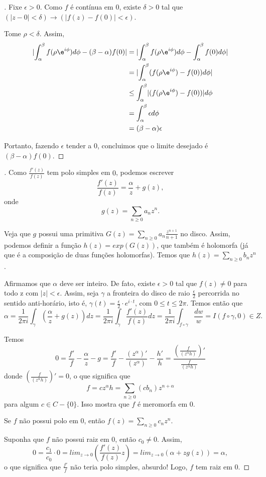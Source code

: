 \begin{proof}[]
Fixe $\epsilon>0$.
Como $f$ é contínua em $0$, existe $\delta>0$ tal que $(\lvert z-0 \rvert < \delta)\rightarrow(\lvert f(z)-f(0)\rvert<\epsilon)$.

Tome $\rho<\delta$.
Assim,
\begin{align*}
\lvert \int_{\alpha}^{\beta}f(\rho\e^{i\phi})d\phi -(\beta-\alpha)f(0)\rvert &= \lvert \int_{\alpha}^{\beta}f(\rho\e^{i\phi})d\phi -\int_{\alpha}^{\beta}f(0)d\phi \rvert  \\
&=\lvert \int_{\alpha}^{\beta}(f(\rho\e^{i\phi})-f(0))d\phi\rvert \\
&\leq \int_{\alpha}^{\beta}\lvert (f(\rho\e^{i\phi})-f(0))\rvert d\phi \\
&=\int_{\alpha}^{\beta}\epsilon d\phi \\
&=(\beta -\alpha)\epsilon \\
\end{align*}

Portanto, fazendo $\epsilon$ tender a $0$, concluimos que o limite desejado é $(\beta - \alpha)f(0)$.




\end{proof}


\begin{proof}[]

Como $\frac{f'(z)}{f(z)}$ tem polo simples em $0$, podemos escrever $$\frac{f'(z)}{f(z)}=\frac{\alpha}{z}+g(z),$$ onde $$g(z)=\sum_{n\geq 0}a_nz^n.$$

Veja que $g$ possui uma primitiva $G(z)=\sum_{n\geq 0}a_n\frac{z^{n+1}}{n+1}$ no disco. Assim, podemos definir a função $h(z)=exp(G(z))$, que também é holomorfa (já que é a composição de duas funções holomorfas). Temos que $h(z)=\sum_{n\geq 0}b_nz^n$.

Afirmamos que $\alpha$ deve ser inteiro. De fato, existe $\epsilon>0$ tal que $f(z)\neq 0$ para todo z com $\lvert z\rvert <\epsilon$. Assim, seja $\gamma$ a fronteira do disco de raio $\frac{\epsilon}{2}$ percorrida no sentido anti-horário, isto é, $\gamma(t)=\frac{\epsilon}{2}\cdot e^{i\cdot t}$, com $0\leq t\leq 2\pi$. Temos então que $$\alpha=\frac{1}{2\pi i}\int_{\gamma}\left(\frac{\alpha}{z}+g(z)\right) dz=\frac{1}{2\pi i}\int_{\gamma}\frac{f'(z)}{f(z)}dz=\frac{1}{2\pi i}\int_{f\circ\gamma}\frac{dw}{w}=I(f \circ \gamma, 0)\in Z.$$

Temos $$0=\frac{f'}{f}-\frac{\alpha}{z}-g=\frac{f'}{f}-\frac{(z^{\alpha})'}{(z^{\alpha})}-\frac{h'}{h}=\frac{(\frac{f}{(z^{\alpha}h)})'}{\frac{f}{(z^{\alpha}h)}}$$ donde $(\frac{f}{(z^{\alpha}h)})'=0$, o que significa que $$f=cz^{\alpha}h=\sum_{n \geq 0}(cb_n)z^{n+\alpha}$$ para algum $c\in C-\{0\}$. Isso mostra que $f$ é meromorfa em $0$.

Se $f$ não possui polo em $0$, então $f(z)=\sum_{n\geq 0}c_nz^n$.

Suponha que $f$ não possui raiz em $0$, então $c_0\neq 0$. Assim, $$0=\frac{c_1}{c_0}\cdot 0=lim_{z\rightarrow 0}\left(\frac{f'(z)}{f(z)}z\right)=lim_{z\rightarrow 0}\left(\alpha+zg(z)\right)=\alpha,$$ o que significa que $\frac{f'}{f}$ não teria polo simples, absurdo! Logo, $f$ tem raiz em $0$.

\end{proof}